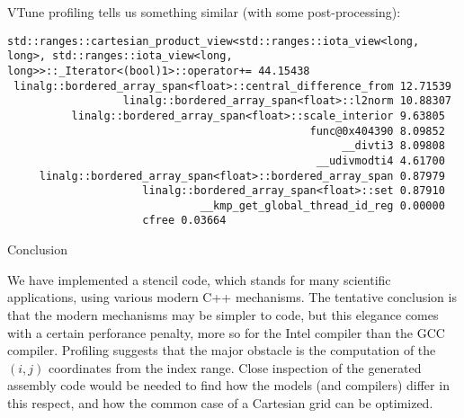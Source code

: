 \begin{comment}
  This makes send if we consider our `diy' implementation:
  \cxxverbatimsnippet{d2ddiyiter}
  Unfortunately it's not the plus-plus operator but the plus-and-is,
  which is the bottlenect.
  For the former we can come up with trickery to lose the divisions:
  \cxxverbatimsnippet{d2ddiziter}
  for the latter that's much harder.
  (Note that the tricked code has no conditionals that could give branch mispredictions!)

  Unfortunately, \indexterm{perf} does not help us much here:
  \begin{lstlisting}[language=verbatim]
    35.25%  [.] linalg::bordered_array_diy2e<float>::l2norm
    31.39%  [.] linalg::bordered_array_diy2e<float>::central_difference_from
    30.46%  [.] linalg::bordered_array_diy2e<float>::scale_interior
    2.29%  [.] linalg::bordered_array_diy2e<float>::set
  \end{lstlisting}
  We get no timings for the embedded iterator.
  Note the counterintuitive result that the norm computation takes more time than the
  central difference,
  despite the latter having more operations
  and more complicated memory access.
\end{comment}

VTune profiling tells us something similar
(with some post-processing):
\begin{lstlisting}[language=verbatim]
std::ranges::cartesian_product_view<std::ranges::iota_view<long, long>, std::ranges::iota_view<long, long>>::_Iterator<(bool)1>::operator+= 44.15438
 linalg::bordered_array_span<float>::central_difference_from 12.71539
                  linalg::bordered_array_span<float>::l2norm 10.88307
          linalg::bordered_array_span<float>::scale_interior 9.63805
                                               func@0x404390 8.09852
                                                    __divti3 8.09808
                                                __udivmodti4 4.61700
     linalg::bordered_array_span<float>::bordered_array_span 0.87979
                     linalg::bordered_array_span<float>::set 0.87910
                              __kmp_get_global_thread_id_reg 0.00000
                     cfree 0.03664
\end{lstlisting}

 {Conclusion}

We have implemented a stencil code, which stands for many scientific applications,
using various modern C++ mechanisms.
The tentative conclusion is that the modern mechanisms may be simpler to code,
but this elegance comes with a certain perforance penalty,
more so for the Intel compiler than the GCC compiler.
Profiling suggests that the major obstacle is the computation
of the $(i,j)$ coordinates from the index range.
Close inspection of the generated assembly code
would be needed to find how the models (and compilers)
differ in this respect, and how the common case
of a Cartesian grid can be optimized.

